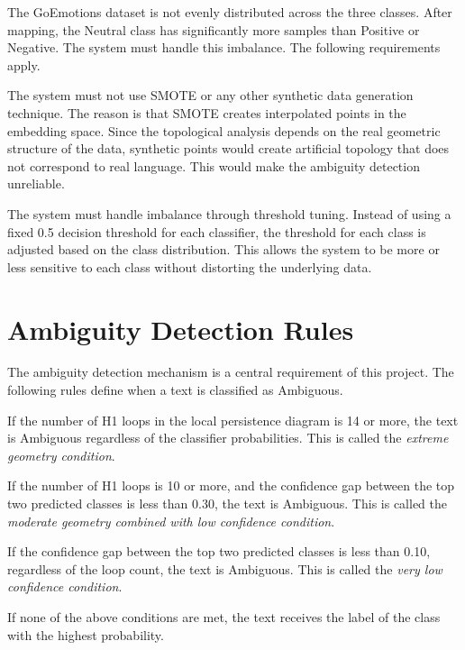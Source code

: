 The GoEmotions dataset is not evenly distributed across the three classes. After mapping, the
Neutral class has significantly more samples than Positive or Negative. The system must handle
this imbalance. The following requirements apply.

\begin{description}[leftmargin=2.5cm, style=nextline]
    \item[IR1.] The system must not use SMOTE or any other synthetic data generation technique.
    The reason is that SMOTE creates interpolated points in the embedding space. Since the
    topological analysis depends on the real geometric structure of the data, synthetic points
    would create artificial topology that does not correspond to real language. This would
    make the ambiguity detection unreliable.
    \item[IR2.] The system must handle imbalance through threshold tuning. Instead of using a
    fixed 0.5 decision threshold for each classifier, the threshold for each class is adjusted
    based on the class distribution. This allows the system to be more or less sensitive to
    each class without distorting the underlying data.
\end{description}

\section{Ambiguity Detection Rules}

The ambiguity detection mechanism is a central requirement of this project. The following rules
define when a text is classified as Ambiguous.

\begin{description}[leftmargin=2.5cm, style=nextline]
    \item[AR1.] If the number of H1 loops in the local persistence diagram is 14 or more, the
    text is Ambiguous regardless of the classifier probabilities. This is called the
    \textit{extreme geometry condition}.
    \item[AR2.] If the number of H1 loops is 10 or more, and the confidence gap between the
    top two predicted classes is less than 0.30, the text is Ambiguous. This is called the
    \textit{moderate geometry combined with low confidence condition}.
    \item[AR3.] If the confidence gap between the top two predicted classes is less than 0.10,
    regardless of the loop count, the text is Ambiguous. This is called the
    \textit{very low confidence condition}.
    \item[AR4.] If none of the above conditions are met, the text receives the label of the class
    with the highest probability.
\end{description}


